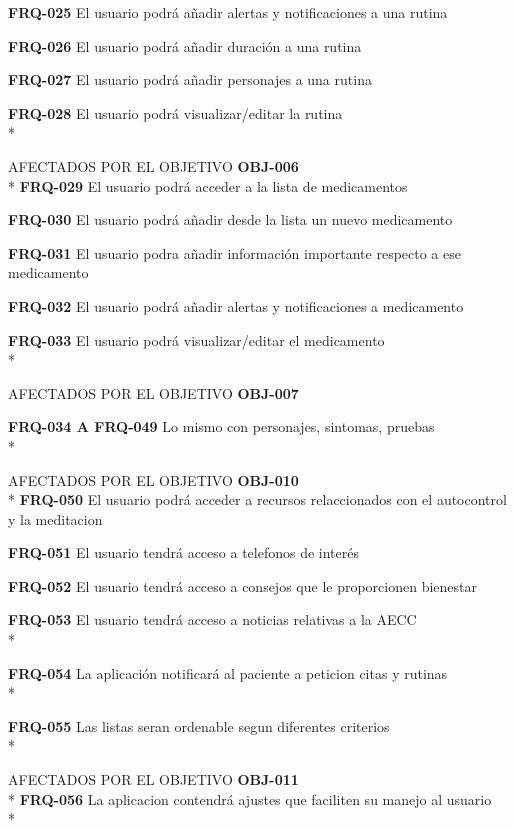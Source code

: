 \documentclass[../pfc.tex]{subfiles}
\begin{document}
	\textbf{FRQ-025}	El usuario podrá añadir alertas y notificaciones a una rutina
	
	\textbf{FRQ-026}	El usuario podrá añadir duración a una rutina
	
	\textbf{FRQ-027}	El usuario podrá añadir personajes a una rutina
	
	\textbf{FRQ-028}	El usuario podrá visualizar/editar la rutina\\*
	
	
	
	
	AFECTADOS POR EL OBJETIVO 	\textbf{OBJ-006}\\*
	\textbf{FRQ-029}	El usuario podrá acceder a la lista de medicamentos
	
	\textbf{FRQ-030}	El usuario podrá añadir desde la lista un nuevo medicamento
	
	\textbf{FRQ-031}	El usuario podra añadir información importante respecto a ese medicamento
	
	\textbf{FRQ-032}	El usuario podrá añadir alertas y notificaciones a medicamento
	
	\textbf{FRQ-033}	El usuario podrá visualizar/editar el medicamento\\*
	
	
	AFECTADOS POR EL OBJETIVO 	\textbf{OBJ-007}
	
	\textbf{FRQ-034 A FRQ-049}	Lo mismo con personajes, sintomas, pruebas\\*
	
	
	
	AFECTADOS POR EL OBJETIVO 	\textbf{OBJ-010}\\*
	\textbf{FRQ-050}	El usuario podrá acceder a recursos relaccionados con el autocontrol y la meditacion
	
	\textbf{FRQ-051}	El usuario tendrá acceso a telefonos de interés
	
	\textbf{FRQ-052}	El usuario tendrá acceso a consejos que le proporcionen bienestar
	
	\textbf{FRQ-053}	El usuario tendrá acceso a noticias relativas a la AECC\\*
	
	
	
	\textbf{FRQ-054}	La aplicación notificará al paciente a peticion citas y rutinas\\*
	
	\textbf{FRQ-055}	Las listas seran ordenable segun diferentes criterios\\*
	
	
	AFECTADOS POR EL OBJETIVO 	\textbf{OBJ-011}\\*
	\textbf{FRQ-056}	La aplicacion contendrá ajustes que faciliten su manejo al usuario\\*
	
\end{document}
